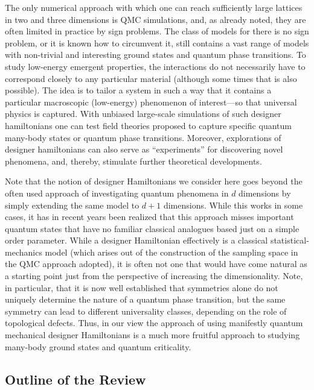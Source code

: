 \documentclass[range]{ar2e}
\begin{document}
The only numerical approach with which one can reach sufficiently large lattices in two and three dimensions
is QMC simulations, and, as already noted, they are often limited in practice by sign problems. The class of
models for there is no sign problem, or it is known how to circumvent it, still contains a vast range of 
models with non-trivial and interesting ground states and quantum phase transitions. To study low-energy
emergent properties, the interactions do not necessarily have to correspond closely to any particular material
(although some times that is also possible). The idea is to tailor a system in such a way that it contains a particular 
macroscopic (low-energy) phenomenon of interest---so that universal physics is captured. With unbiased large-scale 
simulations of such designer hamiltonians one can test field theories proposed to capture specific quantum many-body 
states or quantum phase transitions. Moreover, explorations of designer hamiltonians can also serve as ``experiments'' 
for discovering novel phenomena, and, thereby, stimulate further theoretical developments.

Note that the notion of designer Hamiltonians we consider here goes beyond the often used approach of investigating
quantum phenomena in $d$ dimensions by simply extending the same model to $d+1$ dimensions. While this works in some cases,
it has in recent years been realized that this approach misses important quantum states that have no familiar classical
analogues based just on a simple order parameter. While a designer Hamiltonian effectively is a classical statistical-mechanics
model (which arises out of the construction of the sampling space in the QMC approach adopted), it is often not one that 
would have come natural as a starting point just from the perspective of increasing the dimensionality. Note, in particular, 
that it is now well established that symmetries alone do not uniquely determine the nature of a quantum phase transition, 
but the same symmetry can lead to different universality classes, depending on the role of topological defects. Thus, in our
view the approach of using manifestly quantum mechanical designer Hamiltonians is a much more fruitful approach to studying 
many-body ground states and quantum criticality.

\subsection{Outline of the Review}
\end{document}
